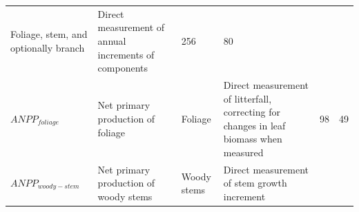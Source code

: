 \documentclass[]{article}
\begin{document}
\begin{longtable}[]{@{}llllll@{}}
\begin{minipage}[t]{0.13\columnwidth}
Foliage, stem, and optionally branch\strut
\end{minipage} & \begin{minipage}[t]{0.23\columnwidth}\raggedright\strut
Direct measurement of annual increments of components\strut
\end{minipage} & \begin{minipage}[t]{0.07\columnwidth}\raggedright\strut
256\strut
\end{minipage} & \begin{minipage}[t]{0.07\columnwidth}\raggedright\strut
80\strut
\end{minipage}\tabularnewline
\begin{minipage}[t]{0.14\columnwidth}\raggedright\strut
\(ANPP_{foliage}\)\strut
\end{minipage} & \begin{minipage}[t]{0.19\columnwidth}\raggedright\strut
Net primary production of foliage\strut
\end{minipage} & \begin{minipage}[t]{0.13\columnwidth}\raggedright\strut
Foliage\strut
\end{minipage} & \begin{minipage}[t]{0.23\columnwidth}\raggedright\strut
Direct measurement of litterfall, correcting for changes in leaf biomass
when measured\strut
\end{minipage} & \begin{minipage}[t]{0.07\columnwidth}\raggedright\strut
98\strut
\end{minipage} & \begin{minipage}[t]{0.07\columnwidth}\raggedright\strut
49\strut
\end{minipage}\tabularnewline
\begin{minipage}[t]{0.14\columnwidth}\raggedright\strut
\(ANPP_{woody-stem}\)\strut
\end{minipage} & \begin{minipage}[t]{0.19\columnwidth}\raggedright\strut
Net primary production of woody stems\strut
\end{minipage} & \begin{minipage}[t]{0.13\columnwidth}\raggedright\strut
Woody stems\strut
\end{minipage} & \begin{minipage}[t]{0.23\columnwidth}\raggedright\strut
Direct measurement of stem growth increment\strut
\end{minipage} & \begin{minipage}[t]{0.07\columnwidth}\raggedright\strut

\end{minipage}
\end{longtable}
\end{document}
